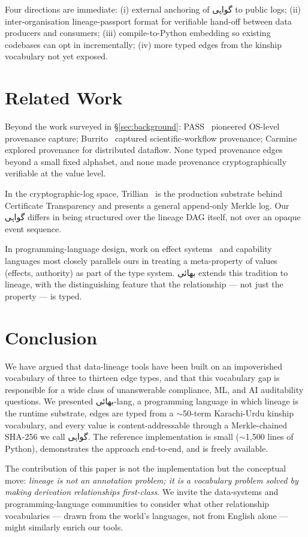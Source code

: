 \documentclass[10pt,twocolumn]{article}
\newcommand{\ur}[1]{{\urdufont #1}}
\begin{document}
Four directions are immediate: (i) external anchoring of \ur{گواہی} to public logs; (ii) inter-organisation lineage-passport format for verifiable hand-off between data producers and consumers; (iii) compile-to-Python embedding so existing codebases can opt in incrementally; (iv) more typed edges from the kinship vocabulary not yet exposed.

\section{Related Work}

Beyond the work surveyed in \S\ref{sec:background}: PASS~\cite{pass} pioneered OS-level provenance capture; Burrito~\cite{burrito} captured scientific-workflow provenance; Carmine~\cite{carmine} explored provenance for distributed dataflow. None typed provenance edges beyond a small fixed alphabet, and none made provenance cryptographically verifiable at the value level.

In the cryptographic-log space, Trillian~\cite{trillian} is the production substrate behind Certificate Transparency and presents a general append-only Merkle log. Our \ur{گواہی} differs in being structured over the lineage DAG itself, not over an opaque event sequence.

In programming-language design, work on effect systems~\cite{koka,frank} and capability languages most closely parallels ours in treating a meta-property of values (effects, authority) as part of the type system. \ur{بھائی} extends this tradition to lineage, with the distinguishing feature that the relationship — not just the property — is typed.

\section{Conclusion}

We have argued that data-lineage tools have been built on an impoverished vocabulary of three to thirteen edge types, and that this vocabulary gap is responsible for a wide class of unanswerable compliance, ML, and AI auditability questions. We presented \ur{بھائی}-lang, a programming language in which lineage is the runtime substrate, edges are typed from a $\sim$50-term Karachi-Urdu kinship vocabulary, and every value is content-addressable through a Merkle-chained SHA-256 we call \ur{گواہی}. The reference implementation is small ($\sim$1{,}500 lines of Python), demonstrates the approach end-to-end, and is freely available.

The contribution of this paper is not the implementation but the conceptual move: \emph{lineage is not an annotation problem; it is a vocabulary problem solved by making derivation relationships first-class}. We invite the data-systems and programming-language communities to consider what other relationship vocabularies — drawn from the world's languages, not from English alone — might similarly enrich our tools.

\printbibliography
\end{document}
